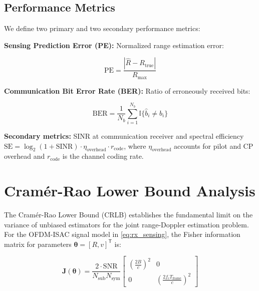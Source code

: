 \documentclass[conference]{IEEEtran}
\newcommand{\mat}[1]{\mathbf{#1}}
\begin{document}
\subsection{Performance Metrics}

We define two primary and two secondary performance metrics:

\textbf{Sensing Prediction Error (PE):} Normalized range estimation error:

\begin{equation}
    \mathrm{PE} = \frac{|\hat{R} - R_{\mathrm{true}}|}{R_{\mathrm{max}}}
    \label{eq:pe}
\end{equation}

\textbf{Communication Bit Error Rate (BER):} Ratio of erroneously received bits:

\begin{equation}
    \mathrm{BER} = \frac{1}{N_b} \sum_{i=1}^{N_b} \mathbb{I}\{\hat{b}_i \neq b_i\}
    \label{eq:ber}
\end{equation}

\textbf{Secondary metrics:} SINR at communication receiver and spectral efficiency $\mathrm{SE} = \log_2(1 + \mathrm{SINR}) \cdot \eta_{\mathrm{overhead}} \cdot r_{\mathrm{code}}$, where $\eta_{\mathrm{overhead}}$ accounts for pilot and CP overhead and $r_{\mathrm{code}}$ is the channel coding rate.

\section{Cram\'er-Rao Lower Bound Analysis}

The Cram\'er-Rao Lower Bound (CRLB) establishes the fundamental limit on the variance of unbiased estimators for the joint range-Doppler estimation problem. For the OFDM-ISAC signal model in \eqref{eq:rx_sensing}, the Fisher information matrix for parameters $\boldsymbol{\theta} = [R, v]^{\mathsf{T}}$ is:

\begin{equation}
    \mat{J}(\boldsymbol{\theta}) = \frac{2 \cdot \mathrm{SNR}}{N_{\mathrm{sub}} N_{\mathrm{sym}}} \begin{bmatrix}
        \left(\frac{2B}{c}\right)^2 & 0 \\
        0 & \left(\frac{2f_c T_{\mathrm{frame}}}{c}\right)^2
    \end{bmatrix}
    \label{eq:fisher}
\end{equation}
\end{document}
